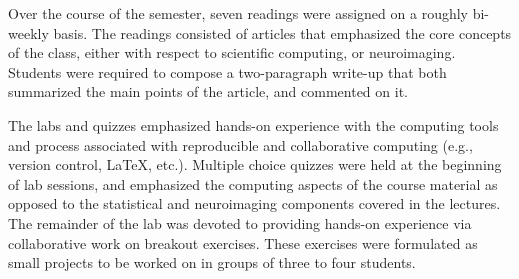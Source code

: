 %

Over the course of the semester, seven readings were assigned on a roughly
bi-weekly basis.
The readings consisted of articles that emphasized the core concepts
of the class, either with respect to scientific computing, or neuroimaging.
Students were required to compose a two-paragraph write-up that both summarized
the main points of the article, and commented on it.

The labs and quizzes emphasized hands-on experience with the computing tools
and process associated with reproducible and collaborative computing (e.g.,
version control, \LaTeX, etc.).
Multiple choice quizzes were held at the beginning of lab sessions, and
emphasized the computing aspects of the course material as
opposed to the statistical and neuroimaging components covered in the lectures.
The remainder of the lab was devoted to providing hands-on experience via
collaborative work on breakout exercises.
These exercises were formulated as small projects to be worked on
in groups of three to four students.

